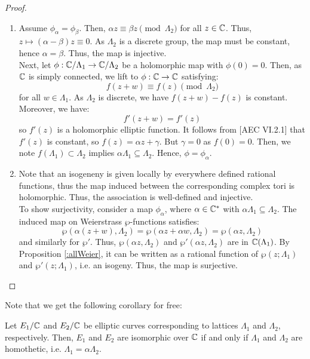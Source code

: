 \documentclass[12pt]{article}
\begin{document}
\begin{proof}
    \bbni
    \begin{enumerate}
        \item Assume $\phi_\alpha = \phi_\beta$. Then, $\alpha z \equiv \beta z \pmod{\Lambda_2}$ for all $z \in \mathbb C$. Thus, $z \mapsto (\alpha-\beta)z \equiv 0$. As $\Lambda_2$ is a discrete group, the map must be constant, hence $\alpha = \beta$. Thus, the map is injective. \\
        Next, let $\phi: \mathbb C/\Lambda_1 \to \mathbb C/\Lambda_2$ be a holomorphic map with $\phi(0) = 0$. Then, as $\mathbb C$ is simply connected, we lift to $\phi:\mathbb C \to \mathbb C$ satisfying: 
        \[ f(z+w) \equiv f(z) \pmod{\Lambda_2} \]
        for all $w \in \Lambda_1$. As $\Lambda_2$ is discrete, we have $f(z+w)-f(z)$ is constant. Moreover, we have:
        \[ f'(z+w) = f'(z)\]
        so $f'(z)$ is a holomorphic elliptic function. It follows from [AEC VI.2.1] that $f'(z)$ is constant, so $f(z) = \alpha z + \gamma$. But $\gamma = 0$ as $f(0) = 0$. Then, we note $f(\Lambda_1) \subset \Lambda_2$ implies $\alpha\Lambda_1 \subseteq \Lambda_2$. Hence, $\phi = \phi_\alpha$.
        \item Note that an isogeneny is given locally by everywhere defined rational functions, thus the map induced between the corresponding complex tori is holomorphic. Thus, the association is well-defined and injective. \\
        To show surjectivity, consider a map $\phi_\alpha$, where $\alpha \in \mathbb C^*$ with $\alpha \Lambda_1 \subseteq \Lambda_2$. The induced map on Weierstrass $\wp$-functions satisfies:
        \[ \wp(\alpha(z+w), \Lambda_2) = \wp(\alpha z + \alpha w, \Lambda_2) = \wp(\alpha z, \Lambda_2)\]
        and similarly for $\wp'$. Thus, $\wp(\alpha z, \Lambda_2)$ and $\wp'(\alpha z, \Lambda_2)$ are in $\mathbb C(\Lambda_1)$. By Proposition \ref{:allWeier}, it can be written as a rational function of $\wp(z; \Lambda_1)$ and $\wp'(z; \Lambda_1)$, i.e. an isogeny. Thus, the map is surjective.
    \end{enumerate}
\end{proof}

Note that we get the following corollary for free:

\begin{corollary}
    Let $E_1/\mathbb C$ and $E_2/\mathbb C$ be elliptic curves corresponding to lattices $\Lambda_1$ and $\Lambda_2$, respectively. Then, $E_1$ and $E_2$ are isomorphic over $\mathbb C$ if and only if $\Lambda_1$ and $\Lambda_2$ are homothetic, i.e. $\Lambda_1 = \alpha \Lambda_2$. 
\end{corollary}
\end{document}
